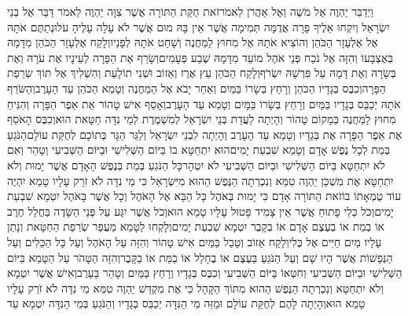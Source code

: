 \documentclass[../main/main.tex]{subfiles}
\begin{document}
\begin{multicols*}{\ncols}
וַיְדַבֵּר יַהְוֶה אֶל מֹשֶׁה וְאֶל אַהֲרֹן לֵאמֹר\PreVerseSpace{}זֹאת חֻקַּת הַתּוֹרָה אֲשֶׁר צִוָּה יַהְוֶה לֵאמֹר דַּבֵּר אֶל בְּנֵי יִשְׂרָאֵל וְיִקְחוּ אֵלֶיךָ פָרָה אֲדֻמָּה תְּמִימָה אֲשֶׁר אֵין בָּהּ מוּם אֲשֶׁר לֹא עָלָה עָלֶיהָ עֹל\PreVerseSpace{}וּנְתַתֶּם אֹתָהּ אֶל אֶלְעָזָר הַכֹּהֵן וְהוֹצִיא אֹתָהּ אֶל מִחוּץ לַמַּחֲנֶה וְשָׁחַט אֹתָהּ לְפָנָיו\PreVerseSpace{}וְלָקַח אֶלְעָזָר הַכֹּהֵן מִדָּמָהּ בְּאֶצְבָּעוֹ וְהִזָּה אֶל נֹכַח פְּנֵי אֹהֶל מוֹעֵד מִדָּמָהּ שֶׁבַע פְּעָמִים\PreVerseSpace{}וְשָׂרַף אֶת הַפָּרָה לְעֵינָיו אֶת עֹרָהּ וְאֶת בְּשָׂרָהּ וְאֶת דָּמָהּ עַל פִּרְשָׁהּ יִשְׂרֹף\PreVerseSpace{}וְלָקַח הַכֹּהֵן עֵץ אֶרֶז וְאֵזוֹב וּשְׁנִי תוֹלָעַת וְהִשְׁלִיךְ אֶל תּוֹךְ שְׂרֵפַת הַפָּרָה\PreVerseSpace{}וְכִבֶּס בְּגָדָיו הַכֹּהֵן וְרָחַץ בְּשָׂרוֹ בַּמַּיִם וְאַחַר יָבֹא אֶל הַמַּחֲנֶה וְטָמֵא הַכֹּהֵן עַד הָעָרֶב\PreVerseSpace{}וְהַשֹּׂרֵף אֹתָהּ יְכַבֵּס בְּגָדָיו בַּמַּיִם וְרָחַץ בְּשָׂרוֹ בַּמָּיִם וְטָמֵא עַד הָעָרֶב\PreVerseSpace{}וְאָסַף אִישׁ טָהוֹר אֵת אֵפֶר הַפָּרָה וְהִנִּיחַ מִחוּץ לַמַּחֲנֶה בְּמָקוֹם טָהוֹר וְהָיְתָה לַעֲדַת בְּנֵי יִשְׂרָאֵל לְמִשְׁמֶרֶת לְמֵי נִדָּה חַטָּאת הוּא\PreVerseSpace{}וְכִבֶּס הָאֹסֵף אֶת אֵפֶר הַפָּרָה אֶת בְּגָדָיו וְטָמֵא עַד הָעָרֶב וְהָיְתָה לִבְנֵי יִשְׂרָאֵל וְלַגֵּר הַגָּר בְּתוֹכָם לְחֻקַּת עוֹלָם\PreVerseSpace{}הַנֹּגֵעַ בְּמֵת לְכָל נֶפֶשׁ אָדָם וְטָמֵא שִׁבְעַת יָמִים\PreVerseSpace{}הוּא יִתְחַטָּא בוֹ בַּיּוֹם הַשְּׁלִישִׁי וּבַיּוֹם הַשְּׁבִיעִי וְטָהֵר\SubEnd{} וְאִם לֹא יִתְחַטָּא בַּיּוֹם הַשְּׁלִישִׁי וּבַיּוֹם הַשְּׁבִיעִי לֹא יִטְהָר\PreVerseSpace{}כָּל הַנֹּגֵעַ בְּמֵת בְּנֶפֶשׁ הָאָדָם אֲשֶׁר יָמוּת וְלֹא יִתְחַטָּא אֶת מִשְׁכַּן יַהְוֶה טִמֵּא וְנִכְרְתָה הַנֶּפֶשׁ הַהוּא מִיִּשְׂרָאֵל כִּי מֵי נִדָּה לֹא זֹרַק עָלָיו טָמֵא יִהְיֶה עוֹד טֻמְאָתוֹ בוֹ\PreVerseSpace{}זֹאת הַתּוֹרָה אָדָם כִּי יָמוּת בְּאֹהֶל כָּל הַבָּא אֶל הָאֹהֶל וְכָל אֲשֶׁר בָּאֹהֶל יִטְמָא שִׁבְעַת יָמִים\PreVerseSpace{}וְכֹל כְּלִי פָתוּחַ אֲשֶׁר אֵין צָמִיד פָּטוּל\SubEnd{} עָלָיו טָמֵא הוּא\PreVerseSpace{}וְכֹל אֲשֶׁר יִגַּע עַל פְּנֵי הַשָּׂדֶה בַּחֲלַל חֶרֶב אוֹ בְמֵת אוֹ בְעֶצֶם אָדָם אוֹ בְקָבֶר יִטְמָא שִׁבְעַת יָמִים\PreVerseSpace{}וְלָקְחוּ לַטָּמֵא מֵעֲפַר שְׂרֵפַת הַחַטָּאת וְנָתַן עָלָיו מַיִם חַיִּים אֶל כֶּלִי\PreVerseSpace{}וְלָקַח אֵזוֹב וְטָבַל בַּמַּיִם אִישׁ טָהוֹר וְהִזָּה עַל הָאֹהֶל וְעַל כָּל הַכֵּלִים וְעַל הַנְּפָשׁוֹת אֲשֶׁר הָיוּ שָׁם וְעַל הַנֹּגֵעַ בַּעֶצֶם אוֹ בֶחָלָל אוֹ בַמֵּת אוֹ בַקָּבֶר\PreVerseSpace{}וְהִזָּה הַטָּהֹר עַל הַטָּמֵא בַּיּוֹם הַשְּׁלִישִׁי וּבַיּוֹם הַשְּׁבִיעִי וְחִטְּאוֹ בַּיּוֹם הַשְּׁבִיעִי וְכִבֶּס בְּגָדָיו וְרָחַץ בַּמַּיִם וְטָהֵר בָּעָרֶב\PreVerseSpace{}וְאִישׁ אֲשֶׁר יִטְמָא וְלֹא יִתְחַטָּא וְנִכְרְתָה הַנֶּפֶשׁ הַהוּא מִתּוֹךְ הַקָּהָל כִּי אֶת מִקְדַּשׁ יַהְוֶה טִמֵּא מֵי נִדָּה לֹא זֹרַק עָלָיו טָמֵא הוּא\PreVerseSpace{}וְהָיְתָה לָהֶם לְחֻקַּת עוֹלָם וּמַזֵּה מֵי הַנִּדָּה יְכַבֵּס בְּגָדָיו וְהַנֹּגֵעַ בְּמֵי הַנִּדָּה יִטְמָא עַד 
\end{multicols*}
\end{document}
